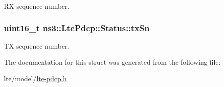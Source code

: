 RX sequence number. 

\subsubsection[{\texorpdfstring{tx\+Sn}{txSn}}]{\setlength{\rightskip}{0pt plus 5cm}uint16\+\_\+t ns3\+::\+Lte\+Pdcp\+::\+Status\+::tx\+Sn}\hypertarget{structns3_1_1LtePdcp_1_1Status_ac76e0dcd8b29a6a13db69624a698d6e8}{}\label{structns3_1_1LtePdcp_1_1Status_ac76e0dcd8b29a6a13db69624a698d6e8}


TX sequence number. 



The documentation for this struct was generated from the following file\+:\begin{DoxyCompactItemize}
\item 
lte/model/\hyperlink{lte-pdcp_8h}{lte-\/pdcp.\+h}\end{DoxyCompactItemize}
